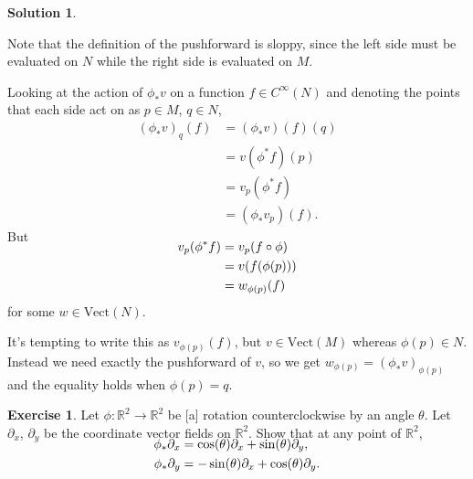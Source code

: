 \documentclass[11pt, a4paper]{report}
\theoremstyle{definition}
\newtheorem{ex}{Exercise}[part]
\newtheorem{sol}{Solution}[part]
\begin{document}
\begin{sol}\label{sol:pushforwardvectorfield}

Note that the definition of the pushforward is sloppy, since the left side must be evaluated on $N$ while the right side is evaluated on $M$.

Looking at the action of $\phi_* v$ on a function $f \in C^\infty (N)$ and denoting the points that each side act on as $p \in M$, $q \in N$,
\begin{align*}
    {(\phi_* v)}_q (f) &= (\phi_* v) (f) (q) \\
                       &= v(\phi^* f)(p) \\
                       &= v_p(\phi^* f) \\
                       &= (\phi_* v_p)(f).
\end{align*}
But
\begin{align*}
    \SwapAboveDisplaySkip
    v_p (\phi^* f) &= v_p (f \circ \phi) \\
                   &= v(f(\phi(p))) \\
                   &= w_{\phi(p)}(f)
\end{align*}
for some $w \in \text{Vect}(N)$.

It's tempting to write this as $v_{\phi(p)}(f)$, but $v \in \text{Vect}(M)$ whereas $\phi(p) \in N$.
Instead we need exactly the pushforward of $v$, so we get $w_{\phi(p)} = {(\phi_* v)}_{\phi(p)}$ and the equality holds when $\phi(p) = q$.

\end{sol}

\begin{ex}

Let $\phi: \mathbb{R}^2 \to \mathbb{R}^2$ be [a] rotation counterclockwise by an angle $\theta$. Let $\partial_x$, $\partial_y$ be the coordinate vector fields on $\mathbb{R}^2$. Show that at any point of $\mathbb{R}^2$,
\begin{align*}
    \SwapAboveDisplaySkip
    \phi_* \partial_x &= \cos(\theta) \partial_x + \sin(\theta) \partial_y, \\
    \phi_* \partial_y &= -\sin(\theta) \partial_x + \cos(\theta) \partial_y.
\end{align*}

\end{ex}
\end{document}

